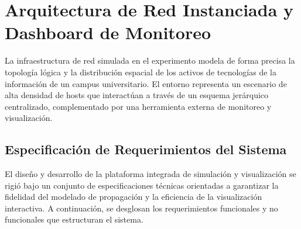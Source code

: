 \section{Arquitectura de Red Instanciada y Dashboard de Monitoreo}
\label{sec:arquitectura}
La infraestructura de red simulada en el experimento modela de forma precisa la topología lógica y la distribución espacial de los activos de tecnologías de la información de un campus universitario. El entorno representa un escenario de alta densidad de hosts que interactúan a través de un esquema jerárquico centralizado, complementado por una herramienta externa de monitoreo y visualización.

\subsection{Especificación de Requerimientos del Sistema}
\label{subsec:requerimientos}
El diseño y desarrollo de la plataforma integrada de simulación y visualización se rigió bajo un conjunto de especificaciones técnicas orientadas a garantizar la fidelidad del modelado de propagación y la eficiencia de la visualización interactiva. A continuación, se desglosan los requerimientos funcionales y no funcionales que estructuran el sistema.

